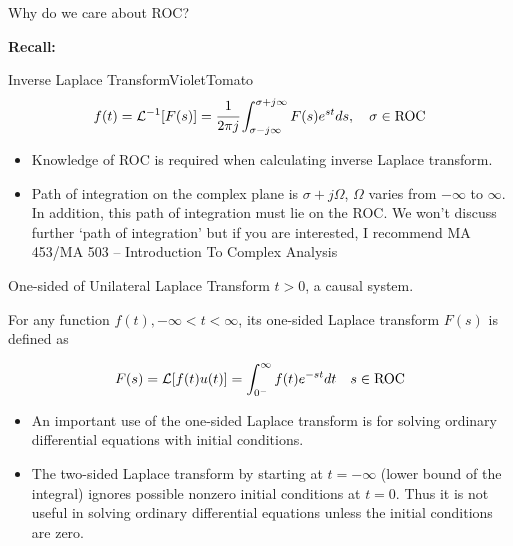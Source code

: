 \documentclass[aspectratio=169,xcolor=dvipsnames,svgnames,x11names,fleqn]{beamer}
\begin{document}
\begin{frame}{Why do we care about ROC?}

\textbf{Recall:}

\begin{custombox}{Inverse Laplace Transform}{Violet}{Tomato}
\large
    $$
    f(t) = {\mathcal L}^{-1}[F(s)] = \cfrac{1}{2\pi j}\int_{\sigma - j\infty}^{\sigma + j\infty} F(s)e^{st}ds, \quad \sigma \in \textrm{ROC}
    $$
\end{custombox}

    \begin{itemize}
        \item Knowledge of ROC is required when calculating inverse Laplace transform.  
\item Path of integration on the complex plane is $\sigma+j\Omega$, $\Omega$ varies from $-\infty$ to $\infty$. In addition, this path of integration must lie on the ROC. We won’t discuss further ‘path of integration’ but if you are interested, I recommend MA 453/MA 503 -- Introduction To Complex Analysis
    \end{itemize}

\end{frame}

\begin{frame}{One-sided of Unilateral Laplace Transform}
$t>0$, a causal system.

For any function $f (t), -\infty <t< \infty$, its one-sided Laplace transform $F(s)$ is defined as

\begin{gradred}
$$
F(s) = {\mathcal L}[f(t)u(t)] = \int_{0^-}^\infty f(t) e^{-st} dt \quad s \in \textrm{ROC}
$$
\end{gradred}

\begin{itemize}
    \item An important use of the one-sided Laplace transform is for solving ordinary differential equations with initial conditions.
    \item  The two-sided Laplace transform by starting at $t = -\infty$ (lower bound of the integral) ignores possible nonzero initial conditions at $t = 0$. Thus it is not useful in solving ordinary differential equations unless the initial conditions are zero.
\end{itemize}
\end{frame}
\end{document}
